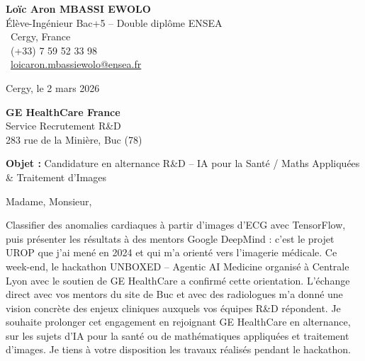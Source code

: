 \documentclass[a4paper,11pt]{article}
\begin{document}
\noindent
\begin{minipage}[t]{0.5\textwidth}
    \textbf{Loïc Aron MBASSI EWOLO}\\
    Élève-Ingénieur Bac+5 -- Double diplôme ENSEA\\[3pt]
    \faMapMarker\ Cergy, France\\
    \faPhone\ (+33) 7 59 52 33 98\\
    \faEnvelope\ \href{mailto:loicaron.mbassiewolo@ensea.fr}{loicaron.mbassiewolo@ensea.fr}
\end{minipage}
\hfill
\begin{minipage}[t]{0.4\textwidth}
    \raggedleft
    Cergy, le 2 mars 2026
\end{minipage}

\vspace{1.2cm}

\hfill
\begin{minipage}[t]{0.5\textwidth}
    \raggedleft
    \textbf{GE HealthCare France}\\
    Service Recrutement R\&D\\
    283 rue de la Minière, Buc (78)
\end{minipage}

\vspace{1cm}

\noindent\textbf{Objet :} Candidature en alternance R\&D -- IA pour la Santé / Maths Appliquées \& Traitement d'Images

\vspace{0.8cm}

Madame, Monsieur,

Classifier des anomalies cardiaques à partir d'images d'ECG avec TensorFlow, puis présenter les résultats à des mentors Google DeepMind : c'est le projet UROP que j'ai mené en 2024 et qui m'a orienté vers l'imagerie médicale. Ce week-end, le hackathon UNBOXED -- Agentic AI Medicine organisé à Centrale Lyon avec le soutien de GE HealthCare a confirmé cette orientation. L'échange direct avec vos mentors du site de Buc et avec des radiologues m'a donné une vision concrète des enjeux cliniques auxquels vos équipes R\&D répondent. Je souhaite prolonger cet engagement en rejoignant GE HealthCare en alternance, sur les sujets d'IA pour la santé ou de mathématiques appliquées et traitement d'images. Je tiens à votre disposition les travaux réalisés pendant le hackathon.
\end{document}
